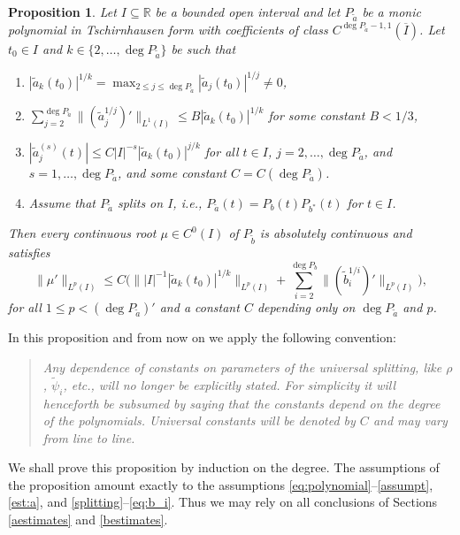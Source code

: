 \documentclass[12pt]{amsart}
\theoremstyle{plain}
\newtheorem{proposition}{Proposition}
\theoremstyle{definition}
\numberwithin{equation}{section}
\begin{document}
\begin{proposition} \label{induction}
  Let $I \subseteq {\mathbb{R}}$ be a bounded open interval and 
  let $P_{\tilde a}$ be a monic polynomial in Tschirnhausen form with coefficients of class $C^{\deg P_{\tilde a}-1,1}({\overline I})$.
  Let $t_0 \in I$ and $k \in \{2,\ldots, \deg P_{\tilde a}\}$ be such that 
  \begin{enumerate}
    \item $|\tilde a_k(t_0)|^{1/k} =  \max_{2 \le j\le \deg P_{\tilde a}} |\tilde a_j(t_0)|^{1/j}\ne 0$,
    \item $\sum_{j=2}^{\deg P_{\tilde a}} \|(\tilde a_j^{1/j})'\|_{L^1(I)} \le B |\tilde a_k(t_0)|^{1/k}$ for some constant $B< 1/3$, 
    \item $|\tilde a_j^{(s)}(t) | \le C |I|^{-s}  |\tilde a_k (t_0)|^{j/k}$ for all $t \in I$, $j = 2, \ldots,\deg P_{\tilde a}$, and 
    $s = 1,\ldots,\deg P_{\tilde a}$, and some constant $C= C(\deg P_{\tilde a})$.
    \item Assume that $P_{\tilde a}$ splits on $I$, i.e., $P_{\tilde a}(t) = P_b(t) P_{b^*}(t)$ for $t \in I$.
  \end{enumerate}
  Then every continuous root $\mu \in C^0(I)$ of $P_{\tilde b}$ is absolutely continuous and satisfies
  \begin{equation} \label{muab}
    \|\mu'\|_{L^p(I)} \le C  \Big( \| |I|^{-1}  {|\tilde a_k(t_0)|^{1/k}} \|_{L^p (I)} 
    + \sum_{i=2}^{\deg P_b} \|(\tilde b_i^{1/i})'\|_{L^p (I)}\Big),
  \end{equation}   
  for all $1 \le p < (\deg P_{\tilde a})'$ and a constant $C$ depending only on $\deg P_{\tilde a}$ and $p$.  
\end{proposition}

In this proposition and from now on we apply the following convention:
\begin{quote}
  \it Any dependence of constants on parameters of the universal splitting, like ${\rho}$, $\tilde {\psi}_i$, etc., will no longer 
      be explicitly stated. For simplicity it will henceforth be subsumed by saying that the constants depend on the degree of 
      the polynomials. Universal constants will be denoted by $C$ and may vary from line to line.   
\end{quote}

We shall prove this proposition by induction on the degree.  
The assumptions of the proposition amount exactly to the assumptions \eqref{eq:polynomial}--\eqref{assumpt}, \eqref{est:a}, and 
\eqref{splitting}--\eqref{eq:b_i}. Thus we may rely on all conclusions of Sections \ref{aestimates} and \ref{bestimates}. 
\end{document}
